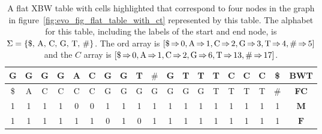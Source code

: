 \documentclass[a4paper,12pt,twoside,BCOR=10mm]{scrbook}
\begin{document}
{
\begin{table}[htb]
\centering
\caption[Flat table corresponding to a graph]{A flat XBW table with cells highlighted that correspond to four nodes in the graph in figure~\ref{fig:evo_fig_flat_table_with_ct} represented by this table. The alphabet for this table, including the labels of the start and end node, is $ \Sigma = \{ \textup{\$, A, C, G, T, $\#$} \} $. The \textup{ord} array is $ [ \$ {\, \Rightarrow \,} 0, \textup{A} {\, \Rightarrow \,} 1, \textup{C} {\, \Rightarrow \,} 2, \textup{G} {\, \Rightarrow \,} 3, \textup{T} {\, \Rightarrow \,} 4, \textup{$\#$} {\, \Rightarrow \,} 5 ] $ and the $ C $ array is $ [ \$ {\, \Rightarrow \,} 0, \textup{A} {\, \Rightarrow \,} 1, \textup{C} {\, \Rightarrow \,} 2, \textup{G} {\, \Rightarrow \,} 6, \textup{T} {\, \Rightarrow \,} 13, \textup{$\#$} {\, \Rightarrow \,} 17 ] $.}
\begin{tabular}{ | c | c | c | c | c | c | c | c | c | c | c | c | c | c | c | c | c | c | c | }
\hline
G & G & G &\cellcolor{purple_bg}\color{purple_fx}G & A & C & G &\cellcolor{green_bg}\color{green_fx}G &\cellcolor{green_bg}\color{green_fx}T & $\#$ & G & T & T &\cellcolor{red_bg}\color{red_fx}T & C & C &\cellcolor{blue_bg}\color{blue_fx}C & \$ & \textbf{BWT} \\ \hline 
\$ & A & C &\cellcolor{purple_bg}\color{purple_fx}C &\cellcolor{purple_bg}\color{purple_fx}C &\cellcolor{purple_bg}\color{purple_fx}C & G & G &\cellcolor{green_bg}\color{green_fx}G & G & G & G & G &\cellcolor{red_bg}\color{red_fx}T & T & T &\cellcolor{blue_bg}\color{blue_fx}T & $\#$ & \textbf{FC} \\ \hline 
1 & 1 & 1 &\cellcolor{purple_bg}\color{purple_fx}1 &\cellcolor{purple_bg}\color{purple_fx}0 &\cellcolor{purple_bg}\color{purple_fx}0 & 1 & 1 &\cellcolor{green_bg}\color{green_fx}1 & 1 & 1 & 1 & 1 &\cellcolor{red_bg}\color{red_fx}1 & 1 & 1 &\cellcolor{blue_bg}\color{blue_fx}1 & 1 & $\boldsymbol{M}$ \\ \hline 
1 & 1 & 1 &\cellcolor{purple_bg}\color{purple_fx}1 & 1 & 1 & 0 &\cellcolor{green_bg}\color{green_fx}1 &\cellcolor{green_bg}\color{green_fx}0 & 1 & 1 & 1 & 1 &\cellcolor{red_bg}\color{red_fx}1 & 1 & 1 &\cellcolor{blue_bg}\color{blue_fx}1 & 1 & $\boldsymbol{F}$ \\ \hline 
\end{tabular}
\label{table:flat_table_with_ct}
\end{table}
}
\end{document}
